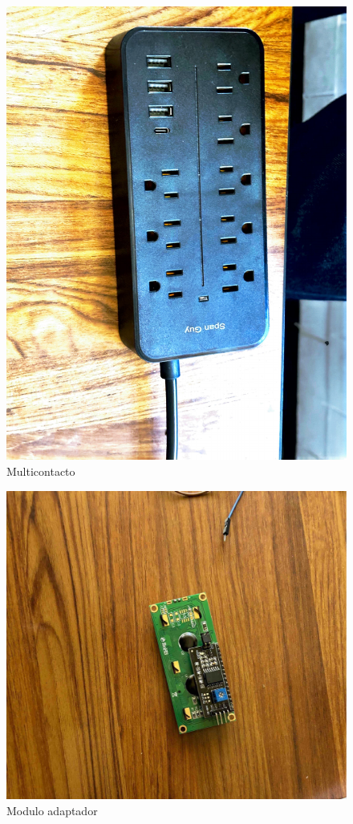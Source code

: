     \begin{figure}[H]
        \centering
        \includegraphics[trim = {30mm 30mm 30mm 10mm},clip,scale=0.2]{8/Img/Multicontacto.pdf}
        \caption{Multicontacto}
        \label{fig:enter-label}
    \end{figure}
    
    \begin{figure}[H]
        \centering
        \includegraphics[trim = {60mm 20mm 60mm 60mm},clip,scale=0.2]{8/Img/Modulo adaptador.pdf}
        \caption{Modulo adaptador}
        \label{fig:enter-label}
    \end{figure}
    
